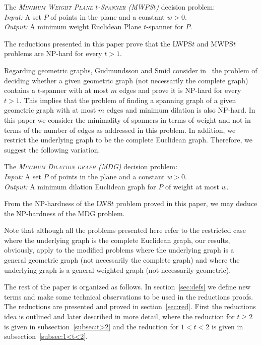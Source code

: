 \documentclass[a4paper]{llncs}
\begin{document}
\begin{myproblem}\label{prob:MWPS$t$}
The \emph{\textsc{Minimum Weight Plane $t$-Spanner} (MWPS$t$)} decision problem:\\
\emph{Input:} A set $P$ of points in the plane and a constant $w>0$.\\
\emph{Output:} A minimum weight Euclidean Plane $t$-spanner for $P$.
\end{myproblem}
The reductions presented in this paper prove that the LWPS$t$ 
and MWPS$t$ problems are NP-hard for every $t>1$.

Regarding geometric graphs, Gudmundsson and Smid consider in~\cite{GudmundssonS09}
the problem of deciding whether a given geometric graph (not necessarily the complete graph)
contains a $t$-spanner with at most $m$ edges and prove it is NP-hard for every $t>1$.
This implies that the problem of finding a spanning graph of a given geometric graph
with at most $m$ edges and minimum dilation is also NP-hard.
In this paper we consider the minimality of spanners in terms of weight
and not in terms of the number of edges as addressed in this problem.
In addition, we restrict the underlying graph to be the complete Euclidean graph.
Therefore, we suggest the following variation.
\begin{myproblem}\label{prob:MDG}
The \emph{\textsc{Minimum Dilation graph} (MDG)} decision problem:\\
\emph{Input:} A set $P$ of points in the plane and a constant $w>0$.\\
\emph{Output:} A minimum dilation Euclidean graph for $P$ of weight at most $w$.
\end{myproblem}
From the NP-hardness of the LWS$t$ problem proved in this paper, 
we may deduce the NP-hardness of the MDG problem.

Note that although all the problems presented here refer to the restricted case 
where the underlying graph is the complete Euclidean graph, 
our results, obviously, apply to the modified problems where the underlying graph is
a general geometric graph (not necessarily the complete graph) and 
where the underlying graph is a general weighted graph (not necessarily geometric).


The rest of the paper is organized as follows.
In section~\ref{sec:defs} we define new terms and make some technical observations 
to be used in the reductions proofs.
The reductions are presented and proved in section~\ref{sec:red}. 
First the reductions idea is outlined and later described in more detail,
where the reduction for $t \geq 2$ is given in subsection~\ref{subsec:t>2}
and the reduction for $1<t<2$ is given in subsection~\ref{subsec:1<t<2}.
\end{document}
